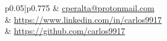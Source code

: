 \documentclass[10pt]{article} %
\begin{document}
\begin{paracol}{2}
	
	
	



\switchcolumn %


\parbox[top][0.12\textheight][c]{\linewidth}{ %
	\vspace{-0.04\textheight} %
	\colorbox{shade}{ %
		\begin{supertabular}{p{0.05\linewidth}|p{0.775\linewidth}} %
			\raisebox{0pt}{\small\faEnvelope} & \href{mailto:cperalta@protonmail.com}{cperalta@protonmail.com} \\ %
			\raisebox{-1pt}{\small\faDesktop} & \href{https://www.linkedin.com/in/carlos9917}{https://www.linkedin.com/in/carlos9917} \\ %
			\raisebox{-1pt}{\faGithub} & \href{https://github.com/carlos9917}{https://github.com/carlos9917} \\ %
		\end{supertabular}
	}
}


\end{paracol}
\end{document}

